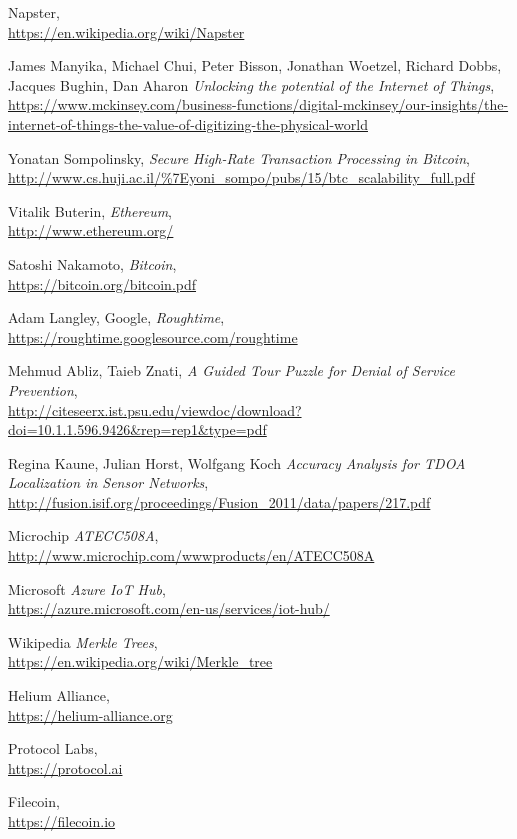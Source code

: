 \documentclass[letterpaper,11pt]{article}
\begin{document}
\begin{thebibliography}{9}

	Napster, \\
		\url{https://en.wikipedia.org/wiki/Napster}

	James Manyika, Michael Chui, Peter Bisson, Jonathan Woetzel, Richard Dobbs, Jacques Bughin, Dan Aharon
		\emph{Unlocking the potential of the Internet of Things}, \\
		\url{https://www.mckinsey.com/business-functions/digital-mckinsey/our-insights/the-internet-of-things-the-value-of-digitizing-the-physical-world}

	Yonatan Sompolinsky,
		\emph{Secure High-Rate Transaction Processing in Bitcoin}, \\
		\url{http://www.cs.huji.ac.il/\%7Eyoni\_sompo/pubs/15/btc\_scalability\_full.pdf}

	Vitalik Buterin,
		\emph{Ethereum},\\
		\url{http://www.ethereum.org/}

	Satoshi Nakamoto,
		\emph{Bitcoin}, \\
		\url{https://bitcoin.org/bitcoin.pdf}

	Adam Langley, Google,
		\emph{Roughtime}, \\
		\url{https://roughtime.googlesource.com/roughtime}

	Mehmud Abliz, Taieb Znati,
		\emph{A Guided Tour Puzzle for Denial of Service Prevention}, \\
		\url{http://citeseerx.ist.psu.edu/viewdoc/download?doi=10.1.1.596.9426&rep=rep1&type=pdf}

	Regina Kaune, Julian Horst, Wolfgang Koch
		\emph{Accuracy Analysis for TDOA Localization in Sensor Networks}, \\
		\url{http://fusion.isif.org/proceedings/Fusion_2011/data/papers/217.pdf}

	Microchip
		\emph{ATECC508A}, \\
		\url{http://www.microchip.com/wwwproducts/en/ATECC508A}

	Microsoft
		\emph{Azure IoT Hub}, \\
		\url{https://azure.microsoft.com/en-us/services/iot-hub/}

	Wikipedia
		\emph{Merkle Trees}, \\
		\url{https://en.wikipedia.org/wiki/Merkle_tree}

	Helium Alliance, \\
		\url{https://helium-alliance.org}

	Protocol Labs, \\
		\url{https://protocol.ai}

	Filecoin, \\
		\url{https://filecoin.io}

\end{thebibliography}
\end{document}
